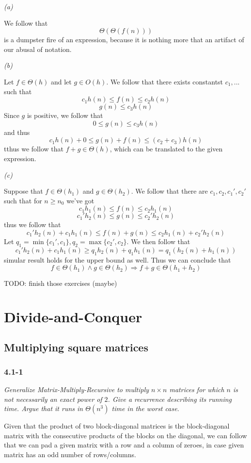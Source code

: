 \documentclass[11pt,oneside,titlepage]{book}
\DeclareMathOperator \ra {\Rightarrow}
\newcommand{\set}[1]{\{ #1 \}}
\begin{document}
\textit{(a)}

We follow that
$$\Theta(\Theta(f(n)))$$
is a dumpster fire of an expression, because it is nothing more that an artifact of
our abusal of notation.

\textit{(b) }

Let $f \in \Theta(h)$ and let $g \in O(h)$. We follow that there exists constantst
$c_1, ...$ such that 
$$ c_1 h(n) \leq f(n) \leq c_2 h(n)$$
$$ g(n) \leq c_3 h(n)$$
Since $g$ is positive, we follow that
$$0 \leq  g(n) \leq c_3 h(n)$$
and thus
$$ c_1 h(n) + 0 \leq g(n) + f(n) \leq (c_2 + c_3) h(n)$$
tthus we follow that $f + g \in \Theta(h)$, which can be translated to the given expression.

\textit{(c)}

Suppose that $f \in \Theta(h_1)$ and $g \in \Theta(h_2)$.
We follow that there are $c_1, c_2, c_1', c_2'$ such that for $n \geq n_0$ we've got 
$$c_1 h_1(n) \leq f(n) \leq c_2 h_1(n)$$
$$c_1' h_2(n) \leq g(n) \leq c_2' h_2(n)$$
thus we follow that
$$c_1' h_2(n) + c_1 h_1(n) \leq f(n) + g(n) \leq c_2 h_1(n) + c_2' h_2(n)$$
Let $q_1 = \min\set{c_1', c_1}, q_2 = \max\set{c_2', c_2}$. We then follow that
$$ c_1' h_2(n) + c_1 h_1(n) \geq q_1 h_2(n) + q_1 h_1(n) = q_1(h_2(n) + h_1(n))$$
simular result holds for the upper bound as well. Thus we can conclude that
$$f \in \Theta(h_1) \land g \in \Theta(h_2) \ra f + g \in \Theta(h_1 + h_2)$$

TODO: finish those exercises (maybe)


\chapter{Divide-and-Conquer}

\section{Multiplying square matrices}

\subsection*{4.1-1}

\textit{Generalize Matrix-Multiply-Recursive to multiply $n \times n$ matrices for which
  $n$ is not necessarily an exact power of $2$. Give a recurrence describing its running
  time. Argue that it runs in $\Theta(n^3)$ time in the worst case.}

Given that the product of two block-diagonal matrices is the block-diagonal matrix with the
consecutive products of the blocks on the diagonal, we can follow that we can
pad a given matrix with a row and a column of zeroes, in case given matrix has an odd number
of rows/columns. 
\end{document}
